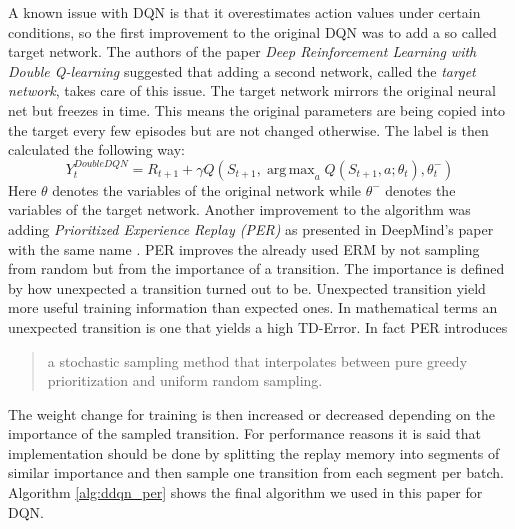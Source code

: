A known issue with DQN is that it overestimates action values under certain conditions, so the first improvement to the original DQN was to add a so called target network.
The authors of the paper \emph{Deep Reinforcement Learning with Double Q-learning} \cite{ddqn} suggested that adding a second network, called the \emph{target network}, takes care of this issue.
The target network mirrors the original neural net but freezes in time.
This means the original parameters are being copied into the target every few episodes but are not changed otherwise.
The label is then calculated the following way:
\begin{equation} \label{eq:double_label}
	Y_t^{DoubleDQN} = R_{t+1} + \gamma Q(S_{t+1}, \operatorname{arg\,max}_{a}Q(S_{t+1}, a; \theta_t), \theta_t^-)
\end{equation}
Here $\theta$ denotes the variables of the original network while $\theta^-$ denotes the variables of the target network.
Another improvement to the algorithm was adding \emph{Prioritized Experience Replay (PER)} as presented in DeepMind's paper with the same name \cite{per}.
PER improves the already used ERM by not sampling from random but from the importance of a transition.
The importance is defined by how unexpected a transition turned out to be.
Unexpected transition yield more useful training information than expected ones.
In mathematical terms an unexpected transition is one that yields a high TD-Error.
In fact PER introduces \blockquote[{\cite[4]{per}}]{a stochastic sampling method that interpolates between pure greedy prioritization and uniform random sampling.}
The weight change for training is then increased or decreased depending on the importance of the sampled transition.
For performance reasons it is said that implementation should be done by splitting the replay memory into segments of similar importance and then sample one transition from each segment per batch.
Algorithm \ref{alg:ddqn_per} shows the final algorithm we used in this paper for DQN.

